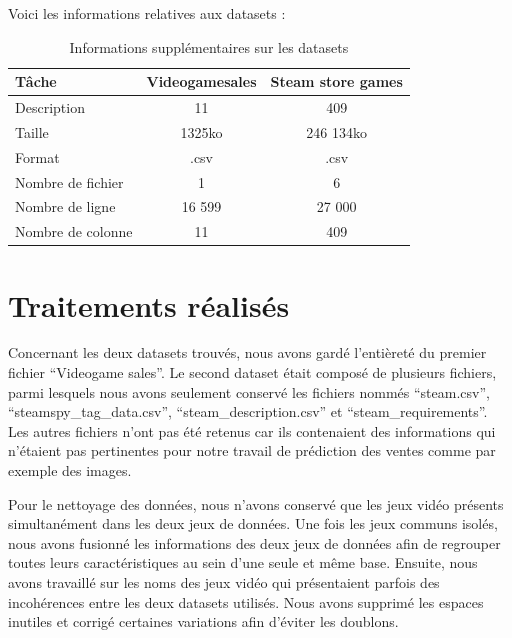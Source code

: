 \documentclass[mstat,12pt]{unswthesis}
\begin{document}
Voici les informations relatives aux datasets :


\begin{table}[H]
\centering
\begin{tabular}{|l|c|c|}
\hline
\textbf{Tâche} & \textbf{Videogamesales} & \textbf{Steam store games} \\
\hline
Description & 11 & 409 \\
\hline
Taille & 1325ko & 246 134ko \\
\hline
Format & .csv & .csv \\
\hline
Nombre de fichier & 1 & 6 \\
\hline
Nombre de ligne & 16 599 & 27 000 \\
\hline
Nombre de colonne & 11 & 409 \\
\hline
\end{tabular}
\caption{Informations supplémentaires sur les datasets}
\end{table}


\hypertarget{descriptifTraitementBD}{%
\section{\textbf{Traitements réalisés}}\label{traitementBD}}

Concernant les deux datasets trouvés, nous avons gardé l'entièreté du premier fichier ``Videogame sales''. Le second dataset était composé de plusieurs fichiers, parmi lesquels nous avons seulement conservé les fichiers nommés ``steam.csv'', ``steamspy\_tag\_data.csv'', ``steam\_description.csv'' et ``steam\_requirements''. Les autres fichiers n'ont pas été retenus car ils contenaient des informations qui n'étaient pas pertinentes pour notre travail de prédiction des ventes comme par exemple des images.

Pour le nettoyage des données, nous n'avons conservé que les jeux vidéo présents simultanément dans les deux jeux de données. Une fois les jeux communs isolés, nous avons fusionné les informations des deux jeux de données afin de regrouper toutes leurs caractéristiques au sein d'une seule et même base. Ensuite, nous avons travaillé sur les noms des jeux vidéo qui présentaient parfois des incohérences entre les deux datasets utilisés. Nous avons supprimé les espaces inutiles et corrigé certaines variations afin d'éviter les doublons.
\end{document}
